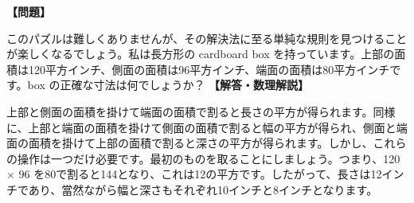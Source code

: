 \documentclass[10pt,a4paper,oneside,openany]{ltjsbook}
\begin{document}
\begin{tcolorbox}[colback=softblue,colframe=primaryblue,title=\textbf{第 178 問：cardboard box （原題: THE CARDBOARD BOX.）},arc=2mm,boxrule=1pt,breakable]
\textbf{【問題】}\par\vspace{0.3em}
このパズルは難しくありませんが、その解決法に至る単純な規則を見つけることが楽しくなるでしょう。私は長方形の cardboard box を持っています。上部の面積は120平方インチ、側面の面積は96平方インチ、端面の面積は80平方インチです。box の正確な寸法は何でしょうか？
\tcblower
\textbf{【解答・数理解説】}\par\vspace{0.3em}
上部と側面の面積を掛けて端面の面積で割ると長さの平方が得られます。同様に、上部と端面の面積を掛けて側面の面積で割ると幅の平方が得られ、側面と端面の面積を掛けて上部の面積で割ると深さの平方が得られます。しかし、これらの操作は一つだけ必要です。最初のものを取ることにしましょう。つまり、120 × 96 を80で割ると144となり、これは12の平方です。したがって、長さは12インチであり、當然ながら幅と深さもそれぞれ10インチと8インチとなります。
\end{tcolorbox}
\end{document}
